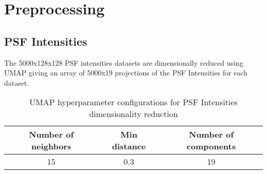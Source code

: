 \section{Preprocessing}

	\subsection{PSF Intensities}
		The 5000x128x128 PSF intensities datasets are dimensionally reduced using UMAP giving an array of 5000x19 projections of the PSF Intensities for each dataset.
		
		\begin{table}[h!]
			\centering
			\begin{tabular}{|c|c|c|}
				\hline
				\textbf{Number of neighbors} & \textbf{Min distance} & \textbf{Number of components} \\
				\hline
				15 & 0.3 & 19 \\
				\hline
			\end{tabular}
		\caption{UMAP hyperparameter configurations for PSF Intensities dimensionality reduction}
		\end{table}